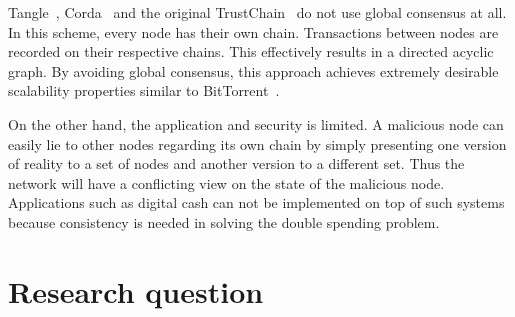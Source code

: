 Tangle~\cite{tangle}, Corda~\cite{corda} and the original TrustChain~\cite{multichain} do not use global consensus at all.
In this scheme, every node has their own chain.
Transactions between nodes are recorded on their respective chains.
This effectively results in a directed acyclic graph.
By avoiding global consensus, this approach achieves extremely desirable scalability properties similar to BitTorrent~\cite{cohen2003incentives}.

On the other hand, the application and security is limited.
A malicious node can easily lie to other nodes regarding its own chain by simply presenting one version of reality to a set of nodes and another version to a different set.
Thus the network will have a conflicting view on the state of the malicious node.
Applications such as digital cash can not be implemented on top of such systems because consistency is needed in solving the double spending problem.



\section{Research question}

